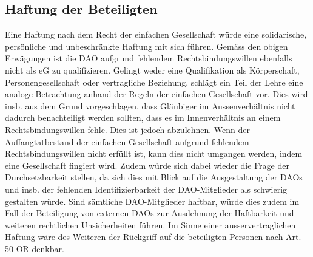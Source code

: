 \documentclass[a4paper,12pt]{report}
\begin{document}
	\subsection{Haftung der Beteiligten}
	\startsubsection
	Eine Haftung nach dem Recht der einfachen Gesellschaft würde eine solidarische, persönliche und unbeschränkte Haftung mit sich führen. Gemäss den obigen Erwägungen ist die DAO aufgrund fehlendem Rechtsbindungswillen ebenfalls nicht als eG zu qualifizieren. Gelingt weder eine Qualifikation als Körperschaft, Personengesellschaft oder vertragliche Beziehung, schlägt ein Teil der Lehre eine analoge Betrachtung anhand der Regeln der einfachen Gesellschaft vor. Dies wird insb. aus dem Grund vorgeschlagen, dass Gläubiger im Aussenverhältnis nicht dadurch benachteiligt werden sollten, dass es im Innenverhältnis an einem Rechtsbindungswillen fehle. Dies ist jedoch abzulehnen. Wenn der Auffangtatbestand der einfachen Gesellschaft aufgrund fehlendem Rechtsbindungswillen nicht erfüllt ist, kann dies nicht umgangen werden, indem eine Gesellschaft fingiert wird. Zudem würde sich dabei wieder die Frage der Durchsetzbarkeit stellen, da sich dies mit Blick auf die Ausgestaltung der DAOs und insb. der fehlenden Identifizierbarkeit der DAO-Mitglieder als schwierig gestalten würde. Sind sämtliche DAO-Mitglieder haftbar, würde dies zudem im Fall der Beteiligung von externen DAOs zur Ausdehnung der Haftbarkeit und weiteren rechtlichen Unsicherheiten führen. Im Sinne einer ausservertraglichen Haftung wäre des Weiteren der Rückgriff auf die beteiligten Personen nach Art. 50 OR denkbar.
	\closesection
\end{document}
